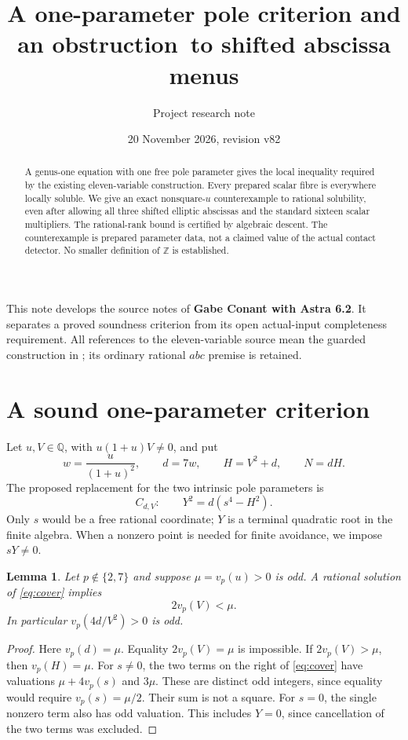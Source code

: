 \documentclass[11pt]{article}
\title{A one-parameter pole criterion and an obstruction\ to shifted abscissa menus}
\author{Project research note}
\date{20 November 2026, revision v82}
\newcommand{\Q}{\mathbb Q}
\newcommand{\Z}{\mathbb Z}
\newcommand{\vp}{v_p}
\newtheorem{lemma}[theorem]{Lemma}
\theoremstyle{remark}\newtheorem{remark}[theorem]{Remark}
\begin{document}
\maketitle
\begin{abstract}
A genus-one equation with one free pole parameter gives the local
inequality required by the existing eleven-variable construction. Every
prepared scalar fibre is everywhere locally soluble. We give an exact
nonsquare-\(u\) counterexample to rational solubility, even after allowing
all three shifted elliptic abscissas and the standard sixteen scalar
multipliers. The rational-rank bound is certified by algebraic descent.
The counterexample is prepared parameter data, not a claimed value of the
actual contact detector. No smaller definition of \(\Z\) is established.
\end{abstract}

This note develops the source notes of \textbf{Gabe Conant with Astra 6.2}.
It separates a proved soundness criterion from its open actual-input
completeness requirement. All references to the eleven-variable source
mean the guarded construction in \cite{eleven}; its ordinary rational
\(abc\) premise is retained.

\section{A sound one-parameter criterion}
Let \(u,V\in\Q\), with \(u(1+u)V\ne0\), and put
\begin{equation}\label{eq:data}
 w=\frac{u}{(1+u)^2},\qquad d=7w,\qquad
 H=V^2+d,\qquad N=dH.
\end{equation}
The proposed replacement for the two intrinsic pole parameters is
\begin{equation}\label{eq:cover}
 C_{d,V}:\qquad Y^2=d(s^4-H^2).
\end{equation}
Only \(s\) would be a free rational coordinate; \(Y\) is a terminal
quadratic root in the finite algebra. When a nonzero point is needed for
finite avoidance, we impose \(sY\ne0\).

\begin{lemma}\label{lem:sound}
Let \(p\notin\{2,7\}\) and suppose \(\mu=\vp(u)>0\) is odd.
A rational solution of \eqref{eq:cover} implies
\begin{equation}\label{eq:needed}
 2\vp(V)<\mu.
\end{equation}
In particular \(\vp(4d/V^2)>0\) is odd.
\end{lemma}
\begin{proof}
Here \(\vp(d)=\mu\). Equality \(2\vp(V)=\mu\) is impossible.
If \(2\vp(V)>\mu\), then \(\vp(H)=\mu\). For \(s\ne0\), the two
terms on the right of \eqref{eq:cover} have valuations
\(\mu+4\vp(s)\) and \(3\mu\). These are distinct odd integers, since
equality would require \(\vp(s)=\mu/2\). Their sum is not a square.
For \(s=0\), the single nonzero term also has odd valuation. This includes
\(Y=0\), since cancellation of the two terms was excluded.
\end{proof}
\end{document}
